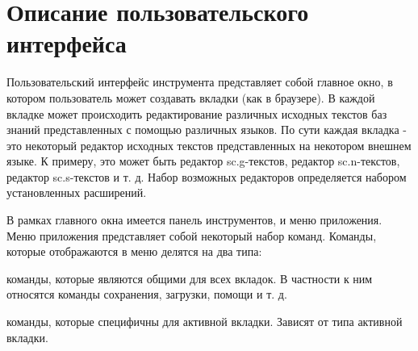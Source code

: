 \newpage
\section{Описание пользовательского интерфейса}

Пользовательский интерфейс инструмента представляет собой главное окно, в котором пользователь может создавать вкладки (как в браузере).
В каждой вкладке может происходить редактирование различных исходных текстов баз знаний представленных с помощью различных языков. 
По сути каждая вкладка - это некоторый редактор исходных текстов представленных на некотором внешнем языке. К примеру, это может быть 
редактор sc.g-текстов, редактор sc.n-текстов, редактор sc.s-текстов и т. д.
Набор возможных редакторов определяется набором установленных расширений.

В рамках главного окна имеется панель инструментов, и меню приложения. Меню приложения представляет собой некоторый набор команд. 
Команды, которые отображаются в меню делятся на два типа:
\begin{list}{•}{}
	\item команды, которые являются общими для всех вкладок. В частности к ним относятся команды сохранения, загрузки, помощи и т. д.
	\item команды, которые специфичны для активной вкладки. Зависят от типа активной вкладки.
\end{list}

